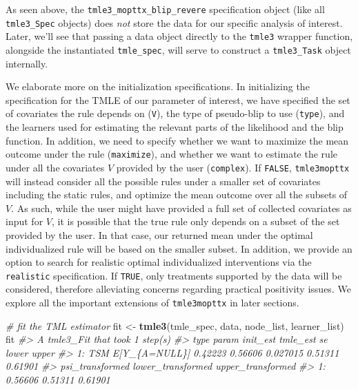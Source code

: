 \documentclass[12pt, krantz2,]{book}
\newenvironment{Shaded}{\begin{snugshade}}{\end{snugshade}}
\newcommand{\CommentTok}[1]{\textcolor[rgb]{0.56,0.35,0.01}{\textit{#1}}}
\newcommand{\KeywordTok}[1]{\textcolor[rgb]{0.13,0.29,0.53}{\textbf{#1}}}
\newcommand{\NormalTok}[1]{#1}
\newcommand{\StringTok}[1]{\textcolor[rgb]{0.31,0.60,0.02}{#1}}
\theoremstyle{definition}
\theoremstyle{definition}
\theoremstyle{definition}
\newcommand{\1}{\mathbbm{1}}
\begin{document}
As seen above, the \texttt{tmle3\_mopttx\_blip\_revere} specification object
(like all \texttt{tmle3\_Spec} objects) does \emph{not} store the data for our
specific analysis of interest. Later,
we'll see that passing a data object directly to the \texttt{tmle3} wrapper function,
alongside the instantiated \texttt{tmle\_spec}, will serve to construct a \texttt{tmle3\_Task}
object internally.

We elaborate more on the initialization specifications. In initializing the
specification for the TMLE of our parameter of interest, we have specified the
set of covariates the rule depends on (\texttt{V}), the type of pseudo-blip to use
(\texttt{type}), and the learners used for estimating the relevant parts of the
likelihood and the blip function. In addition, we need to specify whether we
want to maximize the mean outcome under the rule (\texttt{maximize}), and whether we
want to estimate the rule under all the covariates \(V\) provided by the user
(\texttt{complex}). If \texttt{FALSE}, \texttt{tmle3mopttx} will instead consider all the possible
rules under a smaller set of covariates including the static rules, and optimize
the mean outcome over all the subsets of \(V\). As such, while the user might have
provided a full set of collected covariates as input for \(V\), it is possible
that the true rule only depends on a subset of the set provided by the user. In
that case, our returned mean under the optimal individualized rule will be based
on the smaller subset. In addition, we provide an option to search for realistic
optimal individualized interventions via the \texttt{realistic} specification. If
\texttt{TRUE}, only treatments supported by the data will be considered, therefore
alleviating concerns regarding practical positivity issues. We explore all the
important extensions of \texttt{tmle3mopttx} in later sections.

\begin{Shaded}
\begin{Highlighting}[]
\CommentTok{# fit the TML estimator}
\NormalTok{fit <-}\StringTok{ }\KeywordTok{tmle3}\NormalTok{(tmle_spec, data, node_list, learner_list)}
\NormalTok{fit}
\CommentTok{#> A tmle3_Fit that took 1 step(s)}
\CommentTok{#>    type         param init_est tmle_est       se   lower   upper}
\CommentTok{#> 1:  TSM E[Y_\{A=NULL\}]  0.42223  0.56606 0.027015 0.51311 0.61901}
\CommentTok{#>    psi_transformed lower_transformed upper_transformed}
\CommentTok{#> 1:         0.56606           0.51311           0.61901}
\end{Highlighting}
\end{Shaded}
\end{document}
